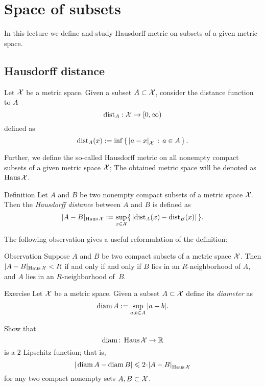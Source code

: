 \chapter{Space of subsets}\label{chap:hausdorff}

In this lecture we define and study Hausdorff metric on subsets of a given metric space.

\section{Hausdorff distance}

Let $\mathcal{X}$ be a metric space.
Given a subset $A\subset \mathcal{X}$,
consider the distance function to $A$
$$\mathrm{dist}_A: \mathcal{X} \to [0,\infty)$$
defined as 
$$\distfun_A(x)
\df
\inf\set{\dist ax{\spc{X}}}{a\in A}.$$

Further, we define the so-called Hausdorff metric on all nonempty compact subsets of a given metric space $\mathcal{X}$;
The obtained metric space will be denoted as $\operatorname{\rm Haus}\nolimits\mathcal{X}$.

\begin{thm}{Definition}\label{def:hausdorff-convergence}
Let $A$ and $B$ be two nonempty compact subsets of a metric space $\mathcal{X}$.
Then the \emph{Hausdorff distance} between $A$ and $B$ is defined as 
$$|A-B|_{\operatorname{\rm Haus}\nolimits\mathcal{X}}
\mathrel{:=}
\sup_{x\in \mathcal{X}}\{\,|\mathrm{dist}_A(x)-\mathrm{dist}_B(x)|\,\}.
$$

\end{thm}

The following observation gives a useful reformulation of the definition:

\begin{thm}{Observation}\label{obs:Haus-nbhds}
Suppose $A$ and $B$ be two compact subsets of a metric space $\mathcal{X}$.
Then $|A-B|_{\operatorname{\rm Haus}\nolimits\mathcal{X}}< R$ if and only if and only if 
$B$ lies in an $R$-neighborhood of $A$, 
and 
$A$ lies in an $R$-neighborhood of~$B$.
\end{thm}

\begin{thm}{Exercise}\label{ex:diam}
Let $\mathcal{X}$ be a metric space.
Given a subset $A\subset \mathcal{X}$ define its \emph{diameter} as 
$$\operatorname{\rm diam}\nolimits A\mathrel{:=}\sup_{a,b\in A} |a-b|.$$

Show that 
$$\operatorname{\rm diam}\nolimits\colon\operatorname{\rm Haus}\nolimits\mathcal{X}\to \mathbb{R}$$ 
is a $2$-Lipschitz function;
that is,
\[|\diam A-\diam B|\le 2\cdot\dist{A}{B}{\Haus\spc{X}}\]
for any two compact nonempty sets $A,B\subset\mathcal{X}$.
\end{thm}


